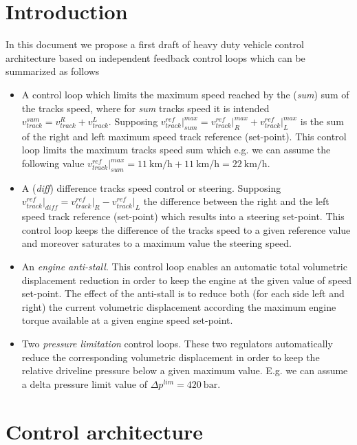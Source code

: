 \documentclass[12pt,a4paper,oneside]{book}
\begin{document}
\begin{onehalfspace}
\section{Introduction}
In this document we propose a first draft of heavy duty vehicle control architecture based on independent feedback control loops which can be summarized as follows
\begin{itemize}
	\item A control loop which limits the maximum speed reached by the (\textit{sum}) sum of the tracks speed, where for \textit{sum} tracks speed it is intended $v_{track}^{sum} = v_{track}^{R} + v_{track}^{L}$. Supposing $v_{track}^{ref}\Big|_{sum}^{max} = v_{track}^{ref}\Big|_{R}^{max} + v_{track}^{ref}\Big|_{L}^{max}$ is the sum of the right and left maximum speed track reference (set-point). This control loop limits the maximum tracks  speed sum which e.g. we can assume the following value $v_{track}^{ref}\Big|_{sum}^{max} = \SI{11}{\kilo\meter\per\hour} + \SI{11}{\kilo\meter\per\hour} = \SI{22}{\kilo\meter\per\hour}$.
	\item A (\textit{diff}) difference tracks speed control or steering. Supposing $v_{track}^{ref}\Big|_{diff} = v_{track}^{ref}\Big|_{R} - v_{track}^{ref}\Big|_{L}$ the difference between the right and the left speed track reference (set-point) which results into a steering set-point. This control loop keeps the difference of the tracks speed to a given reference value and moreover saturates to a maximum value the steering speed.
	\item An \textit{engine anti-stall}. This control loop enables an automatic total volumetric displacement reduction in order to keep the engine at the given value of speed set-point. The effect of the anti-stall is to reduce both (for each side left and right) the current volumetric displacement according the maximum engine torque available at a given engine speed set-point. 
	\item Two \textit{pressure limitation} control loops. These two regulators automatically reduce the corresponding volumetric displacement in order to keep the relative driveline pressure below a given maximum value. E.g. we can assume a delta pressure limit value of $\Delta p^{lim}=\SI{420}{\bar}$.
\end{itemize}
\section{Control architecture}

\end{onehalfspace}
\end{document}
